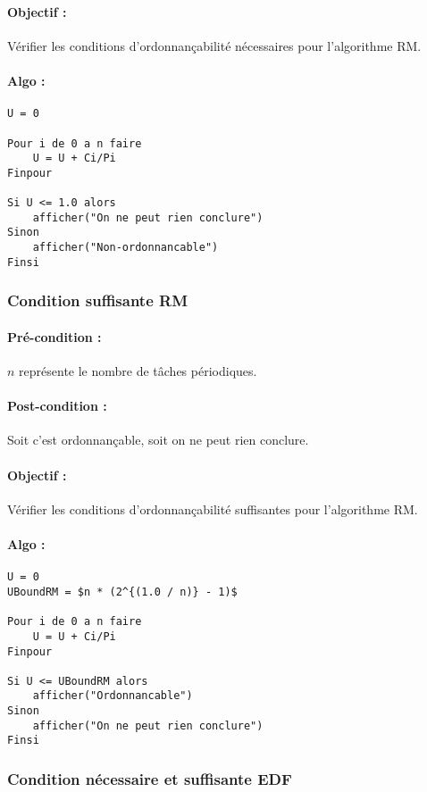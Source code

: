 				\paragraph{Objectif :} Vérifier les conditions d'ordonnançabilité nécessaires pour l'algorithme RM.
				\paragraph{Algo :} 
					\begin{lstlisting}
U = 0
					
Pour i de 0 a n faire
	U = U + Ci/Pi
Finpour		

Si U <= 1.0 alors
	afficher("On ne peut rien conclure")
Sinon
	afficher("Non-ordonnancable")
Finsi
					\end{lstlisting}
			
			\subsubsection{Condition suffisante RM}
				\paragraph{Pré-condition :} $n$ représente le nombre de tâches périodiques.
				\paragraph{Post-condition :} Soit c'est ordonnançable, soit on ne peut rien conclure.
				\paragraph{Objectif :} Vérifier les conditions d'ordonnançabilité suffisantes pour l'algorithme RM.
				\paragraph{Algo :} 
					\begin{lstlisting}[mathescape]
U = 0
UBoundRM = $n * (2^{(1.0 / n)} - 1)$
					
Pour i de 0 a n faire
	U = U + Ci/Pi
Finpour

Si U <= UBoundRM alors
	afficher("Ordonnancable")
Sinon
	afficher("On ne peut rien conclure")
Finsi
					\end{lstlisting}
			
			\subsubsection{Condition nécessaire et suffisante EDF}
